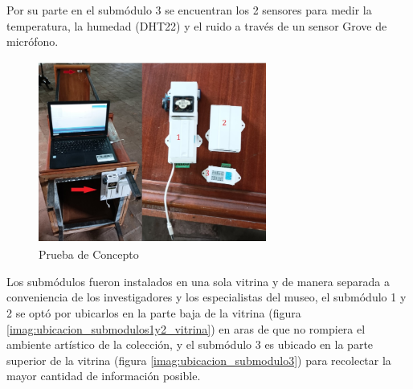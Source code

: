     Por su parte en el submódulo 3 se encuentran los 2 sensores para medir la temperatura, la humedad (DHT22) y el ruido a través de un sensor Grove de micrófono.\\
    
    \begin{figure}[H]
      \centering
      \includegraphics[width=7.5cm, height=6cm]{imagenes/prueba_concepto.jpg}
      \caption{Prueba de Concepto}
      \label{imag:prueba_concepto}
    \end{figure}

    Los submódulos fueron instalados en una sola vitrina y de manera separada a conveniencia de los investigadores y los especialistas del museo, el submódulo 1 y 2 se optó por ubicarlos en la parte baja de la vitrina (figura \ref{imag:ubicacion_submodulos1y2_vitrina}) en aras de que no rompiera el ambiente artístico de la colección,
    y el submódulo 3 es ubicado en la parte superior de la vitrina (figura \ref{imag:ubicacion_submodulo3}) para recolectar la mayor cantidad de información posible.

